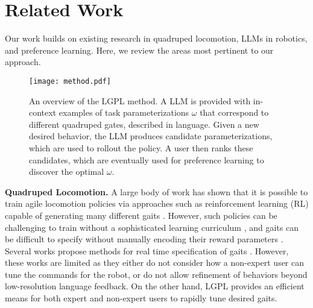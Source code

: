 \section{Related Work}
Our work builds on existing research in quadruped locomotion, LLMs in robotics, and preference learning. Here, we review the areas most pertinent to our approach.

\begin{figure*}[h]
  \centering
  \vspace{0.05in}
  \texttt{[image: method.pdf]}
  \caption{An overview of the LGPL method. A LLM is provided with in-context examples of task parameterizations $\omega$ that correspond to different quadruped gates, described in language. Given a new desired behavior, the LLM produces candidate parameterizations, which are used to rollout the policy. A user then ranks these candidates, which are eventually used for preference learning to discover the optimal $\omega$.}
  \label{fig:method}
  \vspace{-0.2in}
\end{figure*}

\noindent\textbf{Quadruped Locomotion.} A large body of work has shown that it is possible to train agile locomotion policies via approaches such as reinforcement learning (RL) capable of generating many different gaits \cite{caluwaerts2023barkour, fu2021minimizing, margolis2023walk, kumar2021rma, lee2020learning, yang2022fast}. However, such policies can be challenging to train without a sophisticated learning curriculum \cite{lee2020learning}, and gaits can be difficult to specify without manually encoding their reward parameters \cite{fu2021minimizing}. Several works propose methods for real time specification of gaits \cite{margolis2023walk, tang2023saytap}. However, these works are limited as they either do not consider how a non-expert user can tune the commands for the robot, or do not allow refinement of behaviors beyond low-resolution language feedback. On the other hand, LGPL provides an efficient means for both expert and non-expert users to rapidly tune desired gaits.

